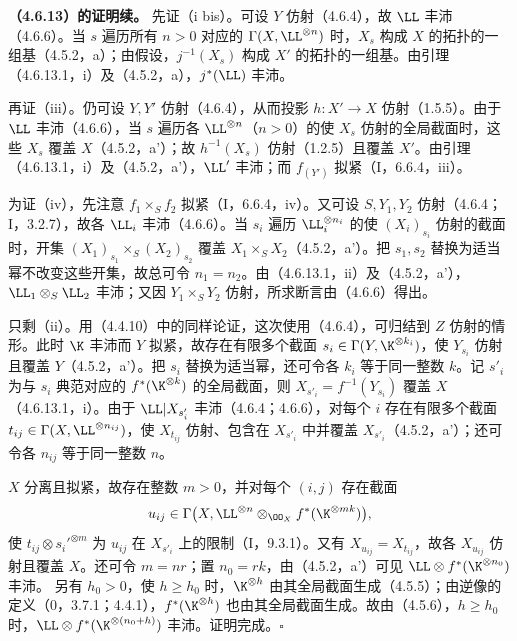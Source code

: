 \noindent\textbf{（4.6.13）的证明续。}
先证（i bis）。可设 $Y$ 仿射（4.6.4），故 $\LL$ 丰沛（4.6.6）。当 $s$ 遍历所有 $n>0$ 对应的 $\Gamma(X,\LL^{\otimes n})$ 时，$X_s$ 构成 $X$ 的拓扑的一组基（4.5.2，a）；由假设，$j^{-1}(X_s)$ 构成 $X'$ 的拓扑的一组基。由引理（4.6.13.1，i）及（4.5.2，a），$j^*(\LL)$ 丰沛。

再证（iii）。仍可设 $Y,Y'$ 仿射（4.6.4），从而投影 $h:X'\to X$ 仿射（1.5.5）。由于 $\LL$ 丰沛（4.6.6），当 $s$ 遍历各 $\LL^{\otimes n}$（$n>0$）的使 $X_s$ 仿射的全局截面时，这些 $X_s$ 覆盖 $X$（4.5.2，a'）；故 $h^{-1}(X_s)$ 仿射（1.2.5）且覆盖 $X'$。由引理（4.6.13.1，i）及（4.5.2，a'），$\LL'$ 丰沛；而 $f_{(Y')}$ 拟紧（I，6.6.4，iii）。

为证（iv），先注意 $f_1\times_S f_2$ 拟紧（I，6.6.4，iv）。又可设 $S,Y_1,Y_2$ 仿射（4.6.4；I，3.2.7），故各 $\LL_i$ 丰沛（4.6.6）。当 $s_i$ 遍历 $\LL_i^{\otimes n_i}$ 的使 $(X_i)_{s_i}$ 仿射的截面时，开集
$(X_1)_{s_1}\times_S(X_2)_{s_2}$ 覆盖 $X_1\times_S X_2$（4.5.2，a'）。把 $s_1,s_2$ 替换为适当幂不改变这些开集，故总可令 $n_1=n_2$。由（4.6.13.1，ii）及（4.5.2，a'），$\LL_1\otimes_S\LL_2$ 丰沛；又因 $Y_1\times_S Y_2$ 仿射，所求断言由（4.6.6）得出。

只剩（ii）。用（4.4.10）中的同样论证，这次使用（4.6.4），可归结到 $Z$ 仿射的情形。此时 $\K$ 丰沛而 $Y$ 拟紧，故存在有限多个截面
$s_i\in\Gamma(Y,\K^{\otimes k_i})$，使 $Y_{s_i}$ 仿射且覆盖 $Y$（4.5.2，a'）。把 $s_i$ 替换为适当幂，还可令各 $k_i$ 等于同一整数 $k$。记 $s'_i$ 为与 $s_i$ 典范对应的 $f^*(\K^{\otimes k})$ 的全局截面，则
$X_{s'_i}=f^{-1}(Y_{s_i})$ 覆盖 $X$（4.6.13.1，i）。由于 $\LL|X_{s'_i}$ 丰沛（4.6.4；4.6.6），对每个 $i$ 存在有限多个截面
$t_{ij}\in\Gamma(X,\LL^{\otimes n_{ij}})$，使 $X_{t_{ij}}$ 仿射、包含在 $X_{s'_i}$ 中并覆盖 $X_{s'_i}$（4.5.2，a'）；还可令各 $n_{ij}$ 等于同一整数 $n$。

$X$ 分离且拟紧，故存在整数 $m>0$，并对每个 $(i,j)$ 存在截面
\[
u_{ij}\in\Gamma\bigl(X,\LL^{\otimes n}\otimes_{\OO_X}f^*(\K^{\otimes mk})\bigr),
\]
使 $t_{ij}\otimes s_i'^{\otimes m}$ 为 $u_{ij}$ 在 $X_{s'_i}$ 上的限制（I，9.3.1）。又有 $X_{u_{ij}}=X_{t_{ij}}$，故各 $X_{u_{ij}}$ 仿射且覆盖 $X$。还可令 $m=nr$；置 $n_0=rk$，由（4.5.2，a'）可见 $\LL\otimes f^*(\K^{\otimes n_0})$ 丰沛。
另有 $h_0>0$，使 $h\geq h_0$ 时，$\K^{\otimes h}$ 由其全局截面生成（4.5.5）；由逆像的定义（0，3.7.1；4.4.1），$f^*(\K^{\otimes h})$ 也由其全局截面生成。故由（4.5.6），$h\geq h_0$ 时，$\LL\otimes f^*(\K^{\otimes(n_0+h)})$ 丰沛。证明完成。\hfill$\square$

